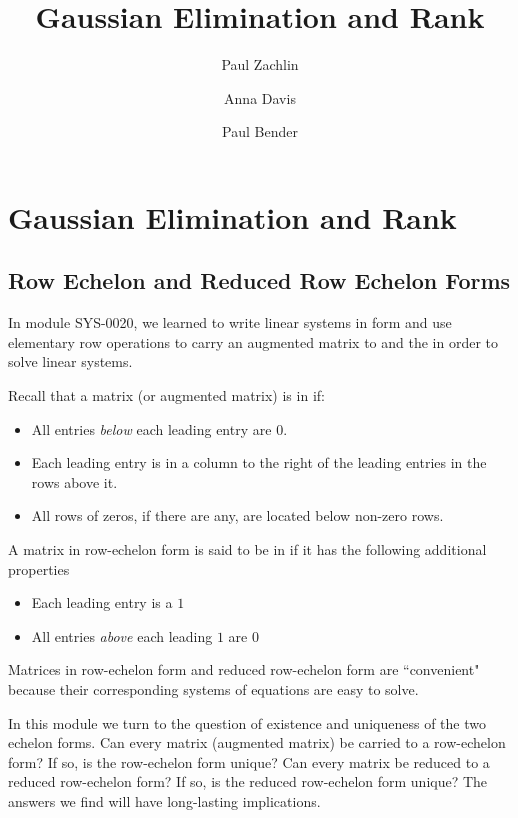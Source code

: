 \documentclass{ximera}
\author{Paul Zachlin \and Anna Davis \and Paul Bender} \title{Gaussian Elimination and Rank} \license{CC-BY 4.0}
\begin{document}
\begin{abstract}
\end{abstract}
\maketitle

\section*{Gaussian Elimination and Rank}
\subsection*{Row Echelon and Reduced Row Echelon Forms}

In module SYS-0020, we learned to write linear systems in  form and use elementary row operations to carry an augmented matrix to  and the  in order to solve linear systems.  

Recall that a matrix (or augmented matrix) is in  if:
\begin{itemize}
\item All entries {\it below} each leading entry are $0$.
\item Each leading entry is in a column to the right of the leading entries in the rows above it.
\item All rows of zeros, if there are any, are located below non-zero rows.
\end{itemize}

A matrix in row-echelon form is said to be in  if it has the following additional properties
\begin{itemize}
\item Each leading entry is a $1$
\item All entries {\it above} each leading $1$ are $0$
\end{itemize}


Matrices in row-echelon form and reduced row-echelon form are ``convenient" because their corresponding systems of equations are easy to solve.  

In this module we turn to the question of existence and uniqueness of the two echelon forms.  Can every matrix (augmented matrix) be carried to a row-echelon form?  If so, is the row-echelon form unique?  Can every matrix be reduced to a reduced row-echelon form?  If so, is the reduced row-echelon form unique?  The answers we find will have long-lasting implications.
\end{document}
